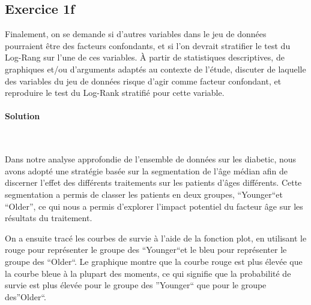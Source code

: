 \documentclass[../main.tex]{subfiles}
\begin{document}
\begin{CJK*}{UTF8}{gbsn}

\section*{Exercice 1f}
Finalement, on se demande si d'autres variables
dans le jeu de données pourraient être des facteurs confondants, et si l'on devrait stratifier le
test du Log-Rang sur l'une de ces variables. À partir de statistiques descriptives, de graphiques
et/ou d'arguments adaptés au contexte de l'étude, discuter de laquelle des variables du jeu de
données risque d'agir comme facteur confondant, et reproduire le test du Log-Rank stratifié pour cette variable.
    
\paragraph{Solution}\
    
Dans notre analyse approfondie de l'ensemble de données sur les diabetic, nous avons adopté une stratégie basée sur la segmentation de l'âge médian afin de discerner l'effet des différents traitements sur les patients d'âges différents. Cette segmentation a permis de classer les patients en deux groupes, “Younger“et “Older”, ce qui nous a permis d'explorer l'impact potentiel du facteur âge sur les résultats du traitement.
    
On a ensuite tracé les courbes de survie à l'aide de la fonction plot, en utilisant le rouge pour représenter le groupe des “Younger“et le bleu pour représenter le groupe des “Older“. Le graphique montre que la courbe rouge est plus élevée que la courbe bleue à la plupart des moments, ce qui signifie que la probabilité de survie est plus élevée pour le groupe des ”Younger“ que pour le groupe des”Older“. 
    

\end{CJK*}
\end{document}
